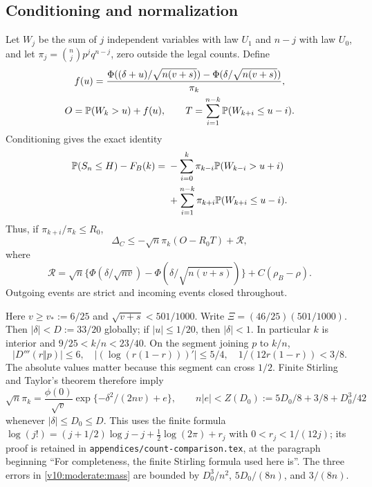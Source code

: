 \subsection{Conditioning and normalization}
Let $W_j$ be the sum of $j$ independent variables with law $U_1$ and
$n-j$ with law $U_0$, and let $\pi_j=\binom njp^jq^{n-j}$, zero outside
the legal counts. Define
\[
 \begin{gathered}
 f(u)=\frac{\Phi((\delta+u)/\sqrt{n(v+s)})-
                  \Phi(\delta/\sqrt{n(v+s)})}{\pi_k},\\
 O=\mathbb P(W_k>u)+f(u),\qquad
 T=\sum_{i=1}^{n-k}\mathbb P(W_{k+i}\le u-i).
 \end{gathered}
\]
Conditioning gives the exact identity
\begin{align*}
 \mathbb P(S_n\le H)-F_B(k)
 ={}&-\sum_{i=0}^k\pi_{k-i}\mathbb P(W_{k-i}>u+i)\\
 &+\sum_{i=1}^{n-k}\pi_{k+i}\mathbb P(W_{k+i}\le u-i).
\end{align*}
Thus, if $\pi_{k+i}/\pi_k\le R_0$,
\begin{equation}\label{v10:moderate:master}
 \Delta_C\le-\sqrt n\pi_k(O-R_0T)+\mathcal R,
\end{equation}
where
\[
 \mathcal R=\sqrt n\{\Phi(\delta/\sqrt{nv})-
             \Phi(\delta/\sqrt{n(v+s)})\}+C(\rho_B-\rho).
\]
Outgoing events are strict and incoming events closed throughout.

Here $v\ge v_*:=6/25$ and
$\sqrt{v+s}<501/1000$. Write
$\Xi=(46/25)(501/1000)$. Then $|\delta|<D:=33/20$ globally;
if $|u|\le1/20$, then $|\delta|<1$. In particular $k$ is interior and
$9/25<k/n<23/40$. On the segment joining $p$ to $k/n$,
\[
 |D'''(r\Vert p)|\le6,\quad
 |(\log(r(1-r)))'|\le5/4,\quad
 1/(12r(1-r))<3/8.
\]
The absolute values matter because this segment can cross $1/2$.
Finite Stirling and Taylor's theorem therefore imply
\begin{equation}\label{v10:moderate:mass}
 \sqrt n\pi_k=\frac{\phi(0)}{\sqrt v}
       \exp\{-\delta^2/(2nv)+e\},\qquad
 n|e|<Z(D_0):=5D_0/8+3/8+D_0^3/42
\end{equation}
whenever $|\delta|\le D_0\le D$. This uses the finite formula
$\log(j!)=(j+1/2)\log j-j+\tfrac12\log(2\pi)+r_j$ with
$0<r_j<1/(12j)$; its proof is retained in
\texttt{appendices/count-comparison.tex}, at the paragraph beginning
``For completeness, the finite Stirling formula used here is''.
The three errors in \eqref{v10:moderate:mass} are bounded by
$D_0^3/n^2$, $5D_0/(8n)$, and $3/(8n)$.

